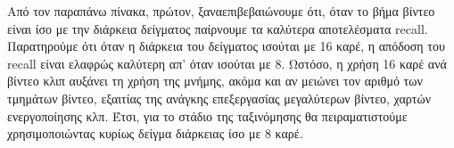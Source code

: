 Από τον παραπάνω πίνακα, πρώτον, ξαναεπιβεβαιώνουμε ότι, όταν το βήμα βίντεο είναι ίσο με την  διάρκεια δείγματος παίρνουμε τα καλύτερα αποτελέσματα \en recall\gr. Παρατηρούμε ότι όταν η διάρκεια του δείγματος ισούται με  16 καρέ, η απόδοση του \en recall \gr είναι
ελαφρώς καλύτερη απ' όταν ισούται με  8.
Ωστόσο, η χρήση  16 καρέ ανά βίντεο κλιπ αυξάνει τη χρήση της μνήμης, ακόμα και αν μειώνει τον αριθμό των τμημάτων βίντεο,
εξαιτίας της ανάγκης επεξεργασίας μεγαλύτερων βίντεο, χαρτών ενεργοποίησης κλπ. Έτσι, για το στάδιο της ταξινόμησης
θα πειραματιστούμε χρησιμοποιώντας κυρίως δείγμα διάρκειας ίσο με  8 καρέ.

